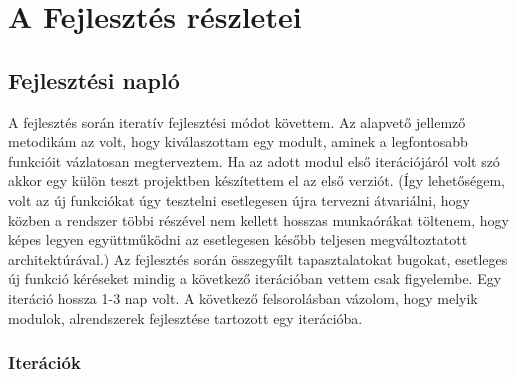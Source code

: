 \documentclass[a4paper,12pt,oneside]{report}
\begin{document}
\section{A Fejlesztés részletei}
\subsection{Fejlesztési napló}
A fejlesztés során iteratív fejlesztési módot követtem. Az alapvető jellemző metodikám az volt, hogy kiválaszottam egy modult, aminek a legfontosabb funkcióit vázlatosan megterveztem. Ha az adott modul első iterációjáról volt szó akkor egy külön teszt projektben készítettem el az első verziót. (Így lehetőségem, volt az új funkciókat úgy tesztelni esetlegesen újra tervezni átvariálni, hogy közben a rendszer többi részével nem kellett hosszas munkaórákat töltenem, hogy képes legyen együttműködni az esetlegesen később teljesen megváltoztatott architektúrával.) Az fejlesztés során összegyűlt tapasztalatokat bugokat, esetleges új funkció kéréseket mindig a következő iterációban vettem csak figyelembe. Egy iteráció hossza 1-3 nap volt. A következő felsorolásban vázolom, hogy melyik modulok, alrendszerek fejlesztése tartozott egy iterációba.
\subsubsection{Iterációk}
\end{document}

